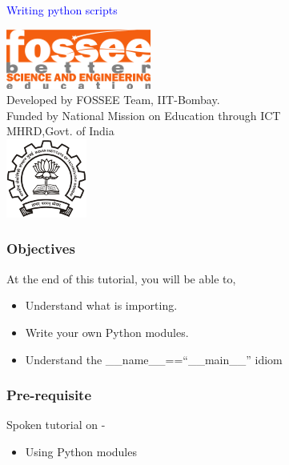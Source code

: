 \documentclass[presentation]{beamer}
\title{}
\author{FOSSEE}
\date{}
\begin{document}
\begin{frame}

\begin{center}
\vspace{12pt}
\textcolor{blue}{\huge Writing python scripts}
\end{center}
\vspace{18pt}
\begin{center}
\vspace{10pt}
\includegraphics[scale=0.95]{../images/fossee-logo.png}\\
\vspace{5pt}
\scriptsize Developed by FOSSEE Team, IIT-Bombay. \\ 
\scriptsize Funded by National Mission on Education through ICT\\
\scriptsize  MHRD,Govt. of India\\
\includegraphics[scale=0.30]{../images/iitb-logo.png}\\
\end{center}
\end{frame}
\begin{frame}
\frametitle{Objectives}
\label{sec-2}

At the end of this tutorial, you will be able to, 


\begin{itemize}
\item Understand what is importing.
\item Write your own Python modules.
\item Understand the \_\_name\_\_==``\_\_main\_\_'' idiom
\end{itemize}
\end{frame}
\begin{frame}
\frametitle{Pre-requisite}
\label{sec-3}

Spoken tutorial on -

\begin{itemize}
\item Using Python modules
\end{itemize}
\end{frame}
\end{document}
